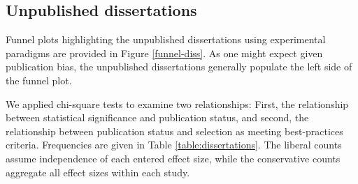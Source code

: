 \documentclass[man]{apa6}
\begin{document}


\subsection{Unpublished dissertations} %
Funnel plots highlighting the unpublished dissertations using experimental paradigms are provided in Figure \ref{funnel-diss}. As one might expect given publication bias, the unpublished dissertations generally populate the left side of the funnel plot. 

We applied chi-square tests to examine two relationships: First, the relationship between statistical significance and publication status, and second, the relationship between publication status and selection as meeting best-practices criteria. Frequencies are given in Table \ref{table:dissertations}. The liberal counts assume independence of each entered effect size, while the conservative counts aggregate all effect sizes within each study.
\end{document}

